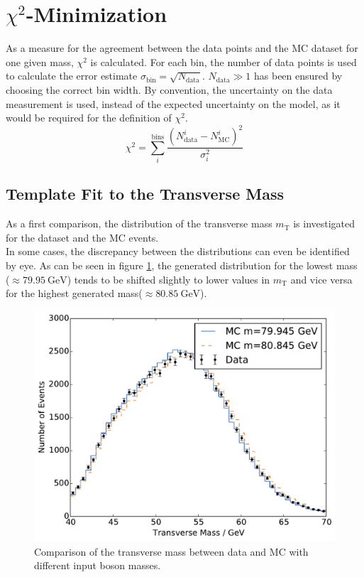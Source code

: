 \documentclass[
	paper=A4,
	parskip=full,
	chapterprefix=true,
	12pt,
	headings=normal,
	bibliography=totoc,
	listof=totoc,
	titlepage=on,
]{scrreprt}
\newcommand{\MT}{\ensuremath{{m_\mathrm{T}}}\xspace}
\begin{document}
\section{$\chi^2$-Minimization}
As a measure for the agreement between the data points and the MC dataset for one given \PW mass, $\chi^2$ is calculated. For each bin, the number of data points is used to calculate the error estimate $\sigma_\mathrm{bin}=\sqrt{N_\mathrm{data}}$. $N_\mathrm{data} \gg 1$ has been ensured by choosing the correct bin width. By convention, the uncertainty on the data measurement is used, instead of the expected uncertainty on the model, as it would be required for the definition of $\chi^2$. 
\begin{equation}
\chi^2=\sum_i^{\mathrm{bins}} \frac{\left(N^i_\mathrm{data}-N^i_\mathrm{MC}\right)^2}{\sigma_i^2}
\label{eq:Chi2}
\end{equation}

\subsection{Template Fit to the Transverse Mass}
As a first comparison, the distribution of the transverse mass \MT is investigated for the dataset and the MC events.\\
In some cases, the discrepancy between the distributions can even be identified by eye. As can be seen in figure \ref{fig:comparison_m_t}, the generated distribution for the lowest \PW mass ($\approx\SI{79.95}{\giga\electronvolt}$) tends to be shifted slightly to lower values in \MT and vice versa for the highest generated \PW mass($\approx\SI{80.85}{\giga\electronvolt}$). 
\begin{figure}
	\centering
	\includegraphics{comparison_m_t}
	\caption{Comparison of the transverse mass between data and MC with different input \PW boson masses.}
	\label{fig:comparison_m_t}
\end{figure}
\end{document}
